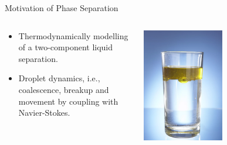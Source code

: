 \begin{frame}{Motivation of Phase Separation}
    \begin{columns}
        \begin{column}{0.5\textwidth}
            \begin{itemize}
                \item Thermodynamically modelling of a two-component liquid separation.
                \item Droplet dynamics, i.e., coalescence, breakup and movement by coupling with Navier-Stokes.
            \end{itemize}
        \end{column}
        \begin{column}{0.5\textwidth}
            \includegraphics[width=0.5\textwidth]{CH-example/oil1.png}
        \end{column}
    \end{columns}
\end{frame}

